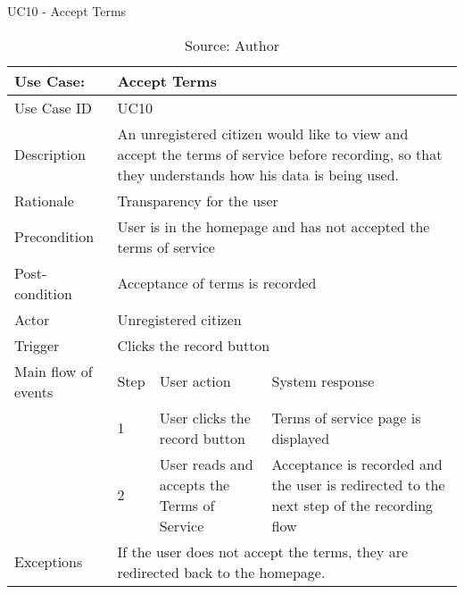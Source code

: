 \begin{table}[h]
\centering
\caption{UC10 - Accept Terms}
\label{uc:10}
\begin{tabular}{|p{3cm}|p{1cm}|p{5cm}|p{5cm}|}
\hline
Use Case:       & \multicolumn{3}{p{11cm}|}{Accept Terms} \\ \hline
Use Case ID     & \multicolumn{3}{p{11cm}|}{UC10} \\ \hline
Description     & \multicolumn{3}{p{11cm}|}{An unregistered citizen would like to view and accept the terms of service before recording, so that they understands how his data is being used.} \\ \hline
Rationale       & \multicolumn{3}{p{11cm}|}{Transparency for the user} \\ \hline
Precondition    & \multicolumn{3}{p{11cm}|}{User is in the homepage and has not accepted the terms of service} \\ \hline
Post-condition  & \multicolumn{3}{p{11cm}|}{Acceptance of terms is recorded} \\ \hline
Actor           & \multicolumn{3}{p{11cm}|}{Unregistered citizen} \\ \hline
Trigger         & \multicolumn{3}{p{11cm}|}{Clicks the record button} \\ \hline
Main flow of events & Step  & User action & System response \\ \hline
                    & 1     & User clicks the record button & Terms of service page is displayed \\ \hline
                    & 2     & User reads and accepts the Terms of Service & Acceptance is recorded and the user is redirected to the next step of the recording flow \\ \hline
Exceptions      & \multicolumn{3}{p{11cm}|}{If the user does not accept the terms, they are redirected back to the homepage.} \\ \hline
\end{tabular}
\caption*{Source: Author}
\end{table}

